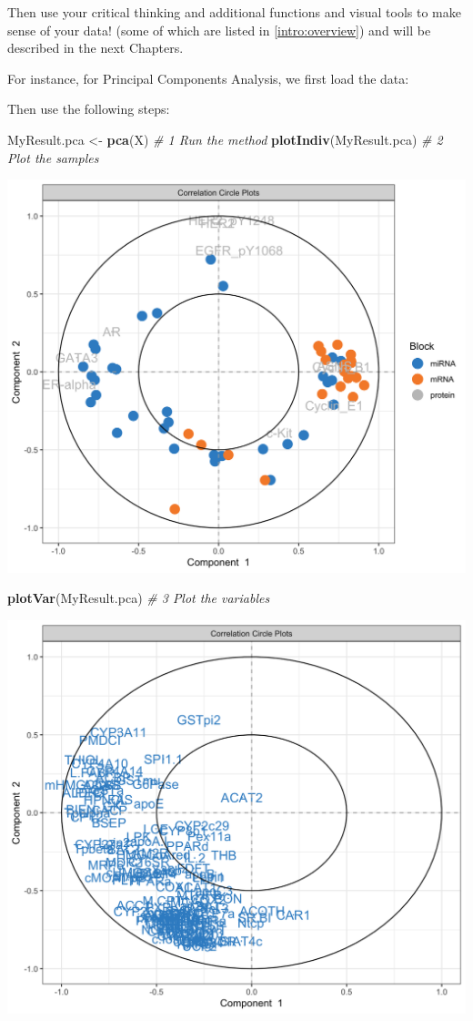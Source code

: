 \documentclass[]{book}
\newenvironment{Shaded}{\begin{snugshade}}{\end{snugshade}}
\newcommand{\KeywordTok}[1]{\textcolor[rgb]{0.13,0.29,0.53}{\textbf{#1}}}
\newcommand{\StringTok}[1]{\textcolor[rgb]{0.31,0.60,0.02}{#1}}
\newcommand{\CommentTok}[1]{\textcolor[rgb]{0.56,0.35,0.01}{\textit{#1}}}
\newcommand{\OperatorTok}[1]{\textcolor[rgb]{0.81,0.36,0.00}{\textbf{#1}}}
\newcommand{\NormalTok}[1]{#1}
\theoremstyle{definition}
\theoremstyle{definition}
\theoremstyle{definition}
\theoremstyle{remark}
\begin{document}
Then use your critical thinking and additional functions and visual
tools to make sense of your data! (some of which are listed in
\ref{intro:overview}) and will be described in the next Chapters.

For instance, for Principal Components Analysis, we first load the data:

\begin{Shaded}
\end{Shaded}

Then use the following steps:

\begin{Shaded}
\begin{Highlighting}[]
\NormalTok{MyResult.pca <-}\StringTok{ }\KeywordTok{pca}\NormalTok{(X)  }\CommentTok{# 1 Run the method}
\KeywordTok{plotIndiv}\NormalTok{(MyResult.pca) }\CommentTok{# 2 Plot the samples}
\end{Highlighting}
\end{Shaded}

\begin{center}\includegraphics[width=0.5\linewidth]{Figures/unnamed-chunk-5-1} \end{center}

\begin{Shaded}
\begin{Highlighting}[]
\KeywordTok{plotVar}\NormalTok{(MyResult.pca)   }\CommentTok{# 3 Plot the variables}
\end{Highlighting}
\end{Shaded}

\begin{center}\includegraphics[width=0.5\linewidth]{Figures/unnamed-chunk-5-2} \end{center}
\end{document}
